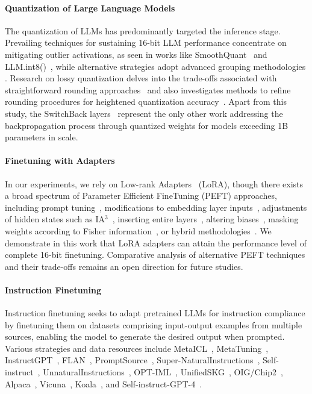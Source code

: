 \paragraph{Quantization of Large Language Models} The quantization of LLMs has predominantly targeted the inference stage. Prevailing techniques for sustaining 16-bit LLM performance concentrate on mitigating outlier activations, as seen in works like SmoothQuant~\citep{xiao2022smoothquant} and LLM.int8()~\citep{dettmers2022llm}, while alternative strategies adopt advanced grouping methodologies \citep{park2022nuqmm, yao2022zeroquant}. Research on lossy quantization delves into the trade-offs associated with straightforward rounding approaches~\citep{dettmers2022case,zeng2022glm,pope2022efficiently} and also investigates methods to refine rounding procedures for heightened quantization accuracy~\citep{frantar2022gptq}. Apart from this study, the SwitchBack layers~\citep{wortsman2023stable} represent the only other work addressing the backpropagation process through quantized weights for models exceeding 1B parameters in scale.

\paragraph{Finetuning with Adapters} In our experiments, we rely on Low-rank Adapters~\citep{hu2021lora} (LoRA), though there exists a broad spectrum of Parameter Efficient FineTuning (PEFT) approaches, including prompt tuning~\citep{qin2021learning,lester2021power,li2021prefix}, modifications to embedding layer inputs~\citep{an2022input}, adjustments of hidden states such as IA$^3$~\citep{liu2022few}, inserting entire layers~\citep{houlsby2019parameter}, altering biases~\citep{zaken2021bitfit}, masking weights according to Fisher information~\citep{sung2021training}, or hybrid methodologies~\citep{henderson2021compacter}. We demonstrate in this work that LoRA adapters can attain the performance level of complete 16-bit finetuning. Comparative analysis of alternative PEFT techniques and their trade-offs remains an open direction for future studies.

\paragraph{Instruction Finetuning} Instruction finetuning seeks to adapt pretrained LLMs for instruction compliance by finetuning them on datasets comprising input-output examples from multiple sources, enabling the model to generate the desired output when prompted. Various strategies and data resources include MetaICL~\citep{min2021metaicl}, MetaTuning~\citep{zhong2021adapting}, InstructGPT~\citep{ouyang2022training}, FLAN~\citep{wei2021finetuned,chung2022scaling}, PromptSource~\citep{bach2022promptsource}, Super-NaturalInstructions~\citep{wang2022super,sanh2021multitask}, Self-instruct~\citep{wang2022self}, UnnaturalInstructions~\citep{honovich2022unnatural}, OPT-IML~\citep{iyer2022opt}, UnifiedSKG~\citep{xie2022unifiedskg}, OIG/Chip2~\citep{laion2023}, Alpaca~\citep{alpaca}, Vicuna~\citep{vicuna2023}, Koala~\citep{koala_blogpost_2023}, and Self-instruct-GPT-4~\citep{peng2023instruction}.

